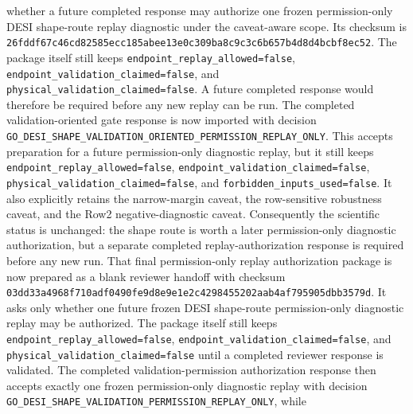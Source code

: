 \documentclass[11pt]{article}
\begin{document}
whether a future completed response may authorize one frozen permission-only
DESI shape-route replay diagnostic under the caveat-aware scope.  Its checksum
is
\texttt{26fddf67\allowbreak{}c46cd825\allowbreak{}85ecc185\allowbreak{}abee13e0\allowbreak{}c309ba8c\allowbreak{}9c3c6b65\allowbreak{}7b4d8d4b\allowbreak{}cbf8ec52}.
The package itself still keeps \texttt{endpoint\_\allowbreak{}replay\_\allowbreak{}allowed=\allowbreak{}false},
\texttt{endpoint\_\allowbreak{}validation\_\allowbreak{}claimed=\allowbreak{}false}, and
\texttt{physical\_\allowbreak{}validation\_\allowbreak{}claimed=\allowbreak{}false}.  A future completed response
would therefore be required before any new replay can be run.
The completed validation-oriented gate response is now imported with decision
\texttt{GO\_\allowbreak{}DESI\_\allowbreak{}SHAPE\_\allowbreak{}VALIDATION\_\allowbreak{}ORIENTED\_\allowbreak{}PERMISSION\_\allowbreak{}REPLAY\_\allowbreak{}ONLY}.
This accepts preparation for a future permission-only diagnostic replay, but it
still keeps
\texttt{endpoint\_\allowbreak{}replay\_\allowbreak{}allowed=\allowbreak{}false},
\texttt{endpoint\_\allowbreak{}validation\_\allowbreak{}claimed=\allowbreak{}false},
\texttt{physical\_\allowbreak{}validation\_\allowbreak{}claimed=\allowbreak{}false}, and
\texttt{forbidden\_\allowbreak{}inputs\_\allowbreak{}used=\allowbreak{}false}.  It also explicitly retains the
narrow-margin caveat, the row-sensitive robustness caveat, and the Row2
negative-diagnostic caveat.  Consequently the scientific status is unchanged:
the shape route is worth a later permission-only diagnostic authorization, but a
separate completed replay-authorization response is required before any new run.
That final permission-only replay authorization package is now prepared as a
blank reviewer handoff with checksum
\texttt{03dd33a4\allowbreak{}968f710a\allowbreak{}df0490fe\allowbreak{}9d8e9e1e\allowbreak{}2c429845\allowbreak{}5202aab4\allowbreak{}af795905\allowbreak{}dbb3579d}.
It asks only whether one future frozen DESI shape-route permission-only
diagnostic replay may be authorized.  The package itself still keeps
\texttt{endpoint\_\allowbreak{}replay\_\allowbreak{}allowed=\allowbreak{}false},
\texttt{endpoint\_\allowbreak{}validation\_\allowbreak{}claimed=\allowbreak{}false}, and
\texttt{physical\_\allowbreak{}validation\_\allowbreak{}claimed=\allowbreak{}false} until a completed reviewer
response is validated.
The completed validation-permission authorization response then accepts exactly
one frozen permission-only diagnostic replay with decision
\texttt{GO\_\allowbreak{}DESI\_\allowbreak{}SHAPE\_\allowbreak{}VALIDATION\_\allowbreak{}PERMISSION\_\allowbreak{}REPLAY\_\allowbreak{}ONLY}, while
\end{document}
